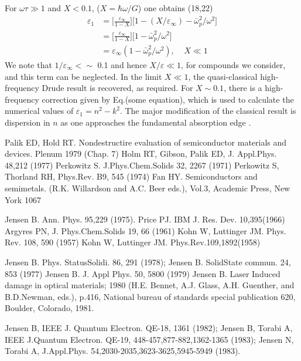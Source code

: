 For $\omega \tau \gg 1$ and $X < 0.1$, ($X = \hbar \omega/G$) one obtains (18,22)
\begin{align}
   \varepsilon_1 &= \Bigg[ \frac{\varepsilon_{\infty}}{1 - X} \Bigg]\big[ 1 - (X/\varepsilon_{\infty}) - \bar\omega_p^2/\omega^2 \big] \\
                &= \Bigg[ \frac{\varepsilon_{\infty}}{1 - X} \Bigg]\big[ 1 - \bar\omega_p^2/\omega^2 \big] \\
                &= \varepsilon_{\infty}(1 - \bar\omega_p^2/\omega^2), \:\:\:\:\: X \ll 1
\end{align}
We note that $1/\varepsilon_{\infty} <\sim$ 0.1 and hence $X/\varepsilon \ll 1$, for compounds we 
consider, and this term can be neglected. In the limit $X \ll 1$, the quasi-classical high-frequency
Drude result is recovered, as required. For $X \sim 0.1$, there is a high-frequency correction given by
Eq.(some equation), which is used to calculate the numerical values of $\varepsilon_1 = n^2 - k^2$.
The major modification of the classical result is dispersion in $n$ as one approaches the fundamental
absorption edge \cite{Jensen1983}.


\begin{thebibliography}{9}
       Palik ED, Hold RT.
       Nondestructire evaluation of semiconductor materials and devices.
       Plenum 1979 (Chap. 7) 
         Holm RT, Gibson, Palik ED, 
         J. Appl.Phys. 48,212 (1977)
         Perkowitz S. J.Phys.Chem.Solids 32, 2267 (1971)
         Perkowitz S, Thorland RH, Phys.Rev. B9, 545 (1974)
         Fan HY.
         Semiconductors and semimetals.
         (R.K. Willardson and A.C. Beer eds.),
         Vol.3, Academic Press, New York 1067

         Jensen B. Ann. Phys. 95,229 (1975).
         Price PJ. IBM J. Res. Dev. 10,395(1966)
         Argyres PN, J. Phys.Chem.Solids 19, 66 (1961)
         Kohn W, Luttinger JM.
         Phys. Rev. 108, 590 (1957)
         Kohn W, Luttinger JM.
         Phys.Rev.109,1892(1958)

         Jensen B. Phys. StatusSolidi. 86, 291 (1978);
         Jensen B. SolidState commun. 24, 853 (1977)
         Jensen B. J. Appl Phys. 50, 5800 (1979)
         Jensen B.
         Laser Induced damage in optical materials; 1980 (H.E. Bennet, A.J. Glass, A.H. Guenther,
         and B.D.Newman, eds.), p.416, National bureau of standards special
         publication 620, Boulder, Colorado, 1981.

         Jensen B, IEEE J. 
         Quantum Electron. QE-18, 1361 (1982); 
         Jensen B, Torabi A, IEEE J.Quantum Electron. QE-19, 448-457,877-882,1362-1365 (1983);
         Jensen N, Torabi A, J.Appl.Phys. 54,2030-2035,3623-3625,5945-5949 (1983).
\end{thebibliography}






